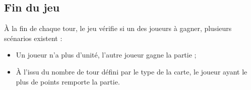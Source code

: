 \documentclass[a4paper,12pt]{article}
\begin{document}
\subsection{Fin du jeu}
À la fin de chaque tour, le jeu vérifie si un des joueurs à gagner, plusieurs scénarios existent :
\begin{itemize}
\item Un joueur n'a plus d'unité, l'autre joueur gagne la partie ;
\item À l'issu du nombre de tour défini par le type de la carte, le joueur ayant le plus de points remporte la partie.
\end{itemize}
\end{document}
